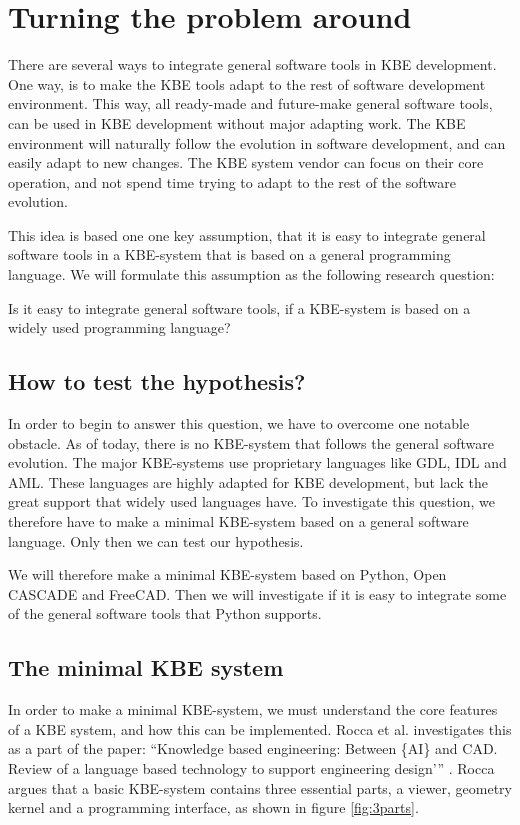 
\section{Turning the problem around} %
\label{sub:turn_the_problem_around}

There are several ways to integrate general software tools in KBE development. One way, is to make the KBE tools adapt to the rest of software development environment. This way, all ready-made and future-make general software tools, can be used in KBE development without major adapting work. The KBE environment will naturally follow the evolution in software development, and can easily adapt to new changes. The KBE system vendor can focus on their core operation, and not spend time trying to adapt to the rest of the software evolution.

This idea is based one one key assumption, that it is easy to integrate general software tools in a KBE-system that is based on a general programming language. We will formulate this assumption as the following research question:

\begin{myrq}
\label{rq:intgenssofttools}
Is it easy to integrate general software tools, if a KBE-system is based on a widely used programming language?
\end{myrq}

\subsection{How to test the hypothesis?} %
\label{ssub:how_to_test_our_hypothises}
In order to begin to answer this question, we have to overcome one notable obstacle. As of today, there is no KBE-system that follows the general software evolution. The major KBE-systems use proprietary languages like GDL, IDL and AML. These languages are highly adapted for KBE development, but lack the great support that widely used languages have. To investigate this question, we therefore have to make a minimal KBE-system based on a general software language. Only then we can test our hypothesis.

We will therefore make a minimal KBE-system based on Python, Open CASCADE and FreeCAD. Then we will investigate if it is easy to integrate some of the general software tools that Python supports.


\subsection{The minimal KBE system} %
\label{sub:the_kbe_system}
In order to make a minimal KBE-system, we must understand the core features of a KBE system, and how this can be implemented. Rocca et al. investigates this as a part of the paper: \enquote{Knowledge based engineering: Between \{AI\} and CAD. Review of a language based technology to support engineering design'} \cite{rocca}. Rocca argues that a basic KBE-system contains three essential parts, a viewer, geometry kernel and a programming interface, as shown in figure \ref{fig:3parts}.

